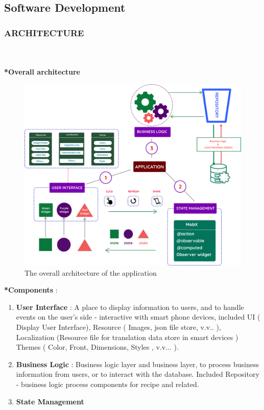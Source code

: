 \documentclass{article}
\begin{document}
\subsection{Software Development}
\subsubsection{ARCHITECTURE}  \\ \\ 
\textbf{*Overall architecture} \\
\begin{figure}[h!]
    \centering
    \includegraphics[scale=0.11]{Images/app-architecture.png}
    \caption{The overall architecture of the application}
    \label{fig:cookingbook}
\end{figure}

\textbf{*Components} :
    \begin{enumerate}
        \item \textbf{User Interface} : A place to display information to users, and to handle events on the user's side - interactive with smart phone devices, included UI ( Display User Interface), Resource ( Images, json file store, v.v.. ), Localization (Resource file for translation data store in smart devices ) Themes ( Color, Front, Dimensions, Styles , v.v... ). 
        \item \textbf{Business Logic } : Business logic layer and business layer, to process business information from users, or to interact with the database. Included Repository - business logic process components for recipe and related.
        \item \textbf{ State Management } 
    \end{enumerate}
\newpage
\end{document}
